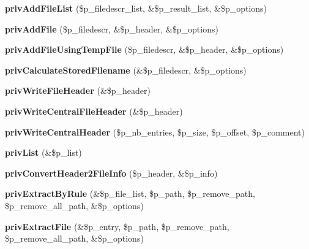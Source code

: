 \begin{DoxyCompactItemize}
\item 
{\bfseries priv\+Add\+File\+List} (\$p\+\_\+filedescr\+\_\+list, \&\$p\+\_\+result\+\_\+list, \&\$p\+\_\+options)\label{class_pcl_zip_a3c0dc4bfabcaa3f771a0b7118e4029c8}

\item 
{\bfseries priv\+Add\+File} (\$p\+\_\+filedescr, \&\$p\+\_\+header, \&\$p\+\_\+options)\label{class_pcl_zip_abea1c6498e47745e4c5f089adcce97b4}

\item 
{\bfseries priv\+Add\+File\+Using\+Temp\+File} (\$p\+\_\+filedescr, \&\$p\+\_\+header, \&\$p\+\_\+options)\label{class_pcl_zip_ac3785da015080b423d00a378fe95154b}

\item 
{\bfseries priv\+Calculate\+Stored\+Filename} (\&\$p\+\_\+filedescr, \&\$p\+\_\+options)\label{class_pcl_zip_a67e7eadfcfa72ad88cd5f283a04eaf3d}

\item 
{\bfseries priv\+Write\+File\+Header} (\&\$p\+\_\+header)\label{class_pcl_zip_a7a0fcb6a4214d18ca47388bbd78c2021}

\item 
{\bfseries priv\+Write\+Central\+File\+Header} (\&\$p\+\_\+header)\label{class_pcl_zip_aa7d087a06a9de7d364b2c05ce03f4b6b}

\item 
{\bfseries priv\+Write\+Central\+Header} (\$p\+\_\+nb\+\_\+entries, \$p\+\_\+size, \$p\+\_\+offset, \$p\+\_\+comment)\label{class_pcl_zip_a5dfd63643d219cbee51462ca1ee6114f}

\item 
{\bfseries priv\+List} (\&\$p\+\_\+list)\label{class_pcl_zip_aeec7d4d7e9f025b4fbfdee77a9db2dfd}

\item 
{\bfseries priv\+Convert\+Header2\+File\+Info} (\$p\+\_\+header, \&\$p\+\_\+info)\label{class_pcl_zip_abd736c627e70c413dbb99c73749f61ca}

\item 
{\bfseries priv\+Extract\+By\+Rule} (\&\$p\+\_\+file\+\_\+list, \$p\+\_\+path, \$p\+\_\+remove\+\_\+path, \$p\+\_\+remove\+\_\+all\+\_\+path, \&\$p\+\_\+options)\label{class_pcl_zip_ad75e17652fb96a0f3b12b312b57155ab}

\item 
{\bfseries priv\+Extract\+File} (\&\$p\+\_\+entry, \$p\+\_\+path, \$p\+\_\+remove\+\_\+path, \$p\+\_\+remove\+\_\+all\+\_\+path, \&\$p\+\_\+options)\label{class_pcl_zip_a074ee8215b46e5bff9c972bb5d666935}


\end{DoxyCompactItemize}

